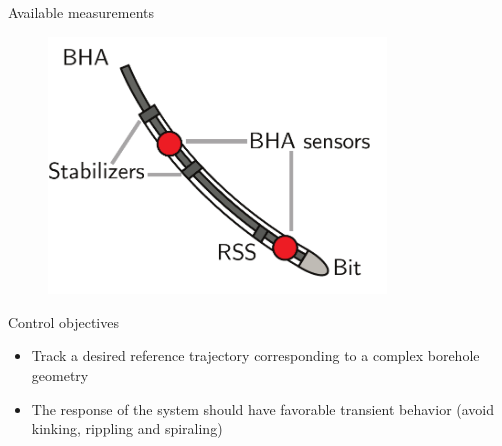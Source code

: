 \documentclass[10pt]{beamer}
\begin{document}
\begin{frame}{Available measurements}
	\begin{figure}[ht]\centering
				\includegraphics[width=0.8\textwidth]{images/Sensors.pdf}
	\end{figure}
\end{frame}


\begin{frame}{Control objectives}
	\begin{itemize}\setlength\itemsep{1.5em}
		\item Track a desired reference trajectory corresponding to a complex borehole geometry
		\item The response of the system should have favorable transient behavior (avoid kinking, rippling and spiraling)
	\end{itemize}
\end{frame}
\end{document}

